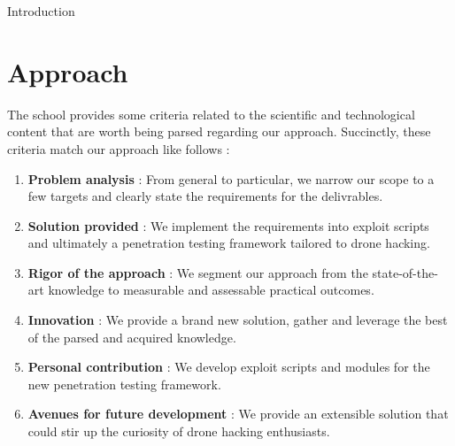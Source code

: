\begin{chaptercover}{Introduction}
\section{Approach}
The school provides some criteria related to the scientific and technological content that are worth being parsed regarding our approach. Succinctly, these criteria match our approach like follows :
{\hyphenation{}
\begin{enumerate}[itemsep=0.1cm,topsep=0.1cm]
  \item {\color{FirstBlue}\bfseries Problem analysis} : From general to particular, we narrow our scope to a few targets and clearly state the requirements for the delivrables.
  \item {\color{FirstBlue}\bfseries Solution provided} : We implement the requirements into exploit scripts and ultimately a penetration testing framework tailored to drone hacking.
  \item {\color{FirstBlue}\bfseries Rigor of the approach} : We segment our approach from the state-of-the-art knowledge to measurable and assessable practical outcomes.
  \item {\color{FirstBlue}\bfseries Innovation} : We provide a brand new solution, gather and leverage the best of the parsed and acquired knowledge.
  \item {\color{FirstBlue}\bfseries Personal contribution} : We develop exploit scripts and modules for the new penetration testing framework.
  \item {\color{FirstBlue}\bfseries Avenues for future development} : We provide an extensible solution that could stir up the curiosity of drone hacking enthusiasts.
\end{enumerate}}


\end{chaptercover}
